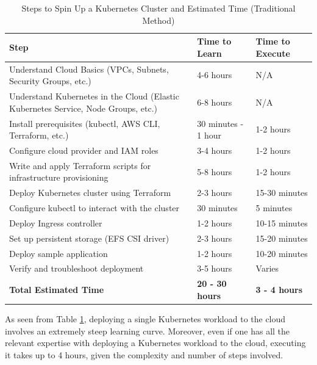 \begin{table}[h]
    \centering
    \renewcommand{\arraystretch}{1.3} %
    \begin{tabular}{|p{8cm}|p{3cm}|p{3cm}|}
        \hline
        \textbf{Step} & \textbf{Time to Learn} & \textbf{Time to Execute} \\
        \hline
        Understand Cloud Basics (VPCs, Subnets, Security Groups, etc.) & 4-6 hours & N/A \\
        \hline
        Understand Kubernetes in the Cloud (Elastic Kubernetes Service, Node Groups, etc.) & 6-8 hours & N/A \\
        \hline
        Install prerequisites (kubectl, AWS CLI, Terraform, etc.) & 30 minutes - 1 hour & 1-2 hours \\
        \hline
        Configure cloud provider and IAM roles & 3-4 hours & 1-2 hours \\
        \hline
        Write and apply Terraform scripts for infrastructure provisioning & 5-8 hours & 1-2 hours \\
        \hline
        Deploy Kubernetes cluster using Terraform & 2-3 hours & 15-30 minutes \\
        \hline
        Configure kubectl to interact with the cluster & 30 minutes & 5 minutes \\
        \hline
        Deploy Ingress controller & 1-2 hours & 10-15 minutes \\
        \hline
        Set up persistent storage (EFS CSI driver) & 2-3 hours & 15-20 minutes \\
        \hline
        Deploy sample application & 1-2 hours & 10-20 minutes \\
        \hline
        Verify and troubleshoot deployment & 3-5 hours & Varies \\
        \hline
        \textbf{Total Estimated Time} & \textbf{20 - 30 hours} & \textbf{3 - 4 hours} \\
        \hline
    \end{tabular}
    \caption{Steps to Spin Up a Kubernetes Cluster and Estimated Time (Traditional Method)}
    \label{table:k8s-cluster-setup}
\end{table}

As seen from Table \ref{table:k8s-cluster-setup}, deploying a single Kubernetes workload to the cloud involves an extremely steep learning curve. Moreover, even if one has all the 
relevant expertise with deploying a Kubernetes workload to the cloud, executing it takes up to 4 hours, given the complexity and number of steps involved.

